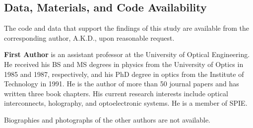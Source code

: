 \documentclass[12pt]{spieman}
\begin{document}
\begin{spacing}{2}
\subsection* {Data, Materials, and Code Availability} 
The code and data that support the findings of this study are available from the corresponding author, A.K.D., upon reasonable request.






\vspace{1ex}
\vspace{2ex}\noindent\textbf{First Author} is an assistant professor at the University of Optical Engineering. He received his BS and MS degrees in physics from the University of Optics in 1985 and 1987, respectively, and his PhD degree in optics from the Institute of Technology in 1991.  He is the author of more than 50 journal papers and has written three book chapters. His current research interests include optical interconnects, holography, and optoelectronic systems. He is a member of SPIE.

\vspace{1ex}
\noindent Biographies and photographs of the other authors are not available.


\listoffigures
\listoftables


\end{spacing}
\end{document}
